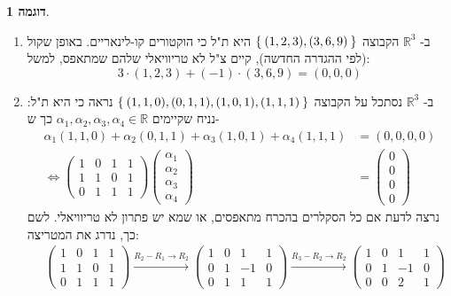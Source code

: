 \documentclass[12pt]{report}
\theoremstyle{plain}
\theoremstyle{definition}
\newtheorem{example}{דוגמה}[chapter]
\newcommand{\R}{\mathbb{R}}
\newcommand{\0}{\mathbf{0}}
\begin{document}
\begin{example}\
\begin{enumerate}[label=\alph*.]
\item
ב-
$\R^3$
הקבוצה
$\Set{(1,2,3),(3,6,9)}$
היא ת"ל כי הוקטורים קו-לינאריים. באופן שקול (לפי ההגדרה החדשה), קיים צ"ל לא טריוויאלי שלהם שמתאפס, למשל:
$$
3\cdot(1,2,3)+(-1)\cdot(3,6,9)=(0,0,0)
$$


\item 
ב-
$\R^3$
נסתכל על הקבוצה
$\Set{(1,1,0),(0,1,1),(1,0,1),(1,1,1)}$
נראה כי היא ת"ל: נניח שקיימים
$\alpha_1,\alpha_2,\alpha_3,\alpha_4\in\R$
כך ש-
$$
\begin{aligned}
\alpha_1(1,1,0)+\alpha_2(0,1,1)+\alpha_3(1,0,1)+\alpha_4(1,1,1)&=(0,0,0,0) \\\iff \begin{pmatrix}
    1 & 0 & 1 & 1\\
    1 & 1 & 0 & 1 \\
    0 & 1 & 1 & 1
    \end{pmatrix}\begin{pmatrix}
    \alpha_1 \\
    \alpha_2 \\
    \alpha_3 \\
    \alpha_4
    \end{pmatrix}&=\begin{pmatrix}
    0 \\
    0 \\
    0 \\
    0
\end{pmatrix}
\end{aligned}
$$
נרצה לדעת אם כל הסקלרים בהכרח מתאפסים, או שמא יש פתרון לא טריוויאלי. לשם כך, נדרג את המטריצה:
$$
\begin{aligned}
&\begin{pmatrix}
    1 & 0 & 1 & 1\\
    1 & 1 & 0 & 1 \\
    0 & 1 & 1 & 1
    \end{pmatrix}\xrightarrow{R_2-R_1\to R_2}\begin{pmatrix}
    1 & 0 & 1 & 1\\
    0 & 1 & -1 & 0 \\
    0 & 1 & 1 & 1
    \end{pmatrix}
    \xrightarrow{R_3-R_2\to R_2}\begin{pmatrix}
    1 & 0 & 1 & 1\\
    0 & 1 & -1 & 0 \\
    0 & 0 & 2 & 1
    \end{pmatrix}\\

\end{aligned}$$
\end{enumerate}
\end{example}
\end{document}
